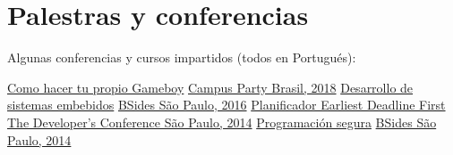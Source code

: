 \documentclass[espanol]{cv-style}          %
\begin{document}
\section{Palestras y conferencias}
\vspace{-0.3cm}
\begin{entrylist}

\entry
{}
{Algunas conferencias y cursos impartidos (todos en Portugués):}
{}
{\vspace{-0.5cm}}

\entry
{}
{\href{https://www.slideshare.net/rafaelmmoreira/como-fazer-seu-prprio-gameboy-cpbr11}{Como hacer tu propio Gameboy}}
{\href{https://campuse.ro/events/campus-party-brasil-2018/workshop/como-fazer-seu-proprio-gameboy-cpbr11/}{Campus Party Brasil, 2018}}
{\vspace{-0.5cm}}
\entry
{}
{\href{https://www.slideshare.net/rafaelmmoreira/desenvolvimento-de-sistemas-embarcados-do-hardware-ao-software}{Desarrollo de sistemas embebidos}}
{\href{https://sp13.securitybsides.com.br/detalhe-dos-treinamentos-e-apresentacoes/}{BSides São Paulo, 2016}}
{\vspace{-0.5cm}}
\entry
{}
{\href{https://www.slideshare.net/rafaelmmoreira/escalonador-earliest-deadline-first-tdc2014sp}{Planificador Earliest Deadline First}}
{\href{https://thedevconf.com/tdc/2014/saopaulo/trilha-embedded}{The Developer's Conference São Paulo, 2014}}
{\vspace{-0.5cm}}
\entry
{}
{\href{https://www.slideshare.net/rafaelmmoreira/programao-segura}{Programación segura}}
{\href{https://garoa.net.br/wiki/O_Outro_Lado_BSidesSP_ed_naovaitercopa/Lightning_Talks}{BSides São Paulo, 2014}}
{\vspace{-0.5cm}}

\end{entrylist}
{\vspace{-0.2cm}}
\end{document}
